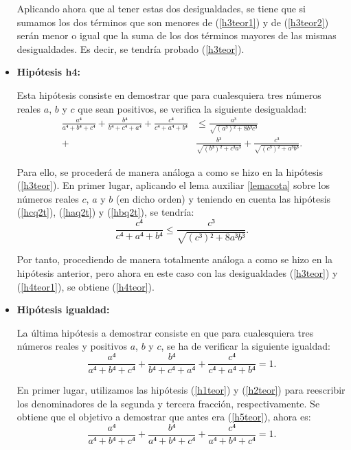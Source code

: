 \begin{demostracion}
\begin{itemize}
    Aplicando ahora que al tener estas dos desigualdades, se tiene que si
    sumamos los dos términos que son menores de (\ref{h3teor1}) y de
    (\ref{h3teor2}) serán menor o igual que la suma de los dos términos
    mayores de las mismas desigualdades. Es decir, se tendría probado
    (\ref{h3teor}).

  \item \textbf{Hipótesis h4:}

    Esta hipótesis consiste en demostrar que para cualesquiera tres números
    reales \(a\), \(b\) y \(c\) que sean positivos, se verifica la
    siguiente desigualdad:
    \begin{align*}\label{h4teor}\tag{h4}
      \frac{a⁴}{a⁴+b⁴+c⁴}+\frac{b⁴}{b⁴+c⁴+a⁴}+\frac{c⁴}{c⁴+a⁴+b⁴}&≤
      \frac{a³}{\sqrt{(a³)²+8b³c³}}\\+&\frac{b³}{\sqrt{(b³)²+c³a³}}+
      \frac{c³}{\sqrt{(c³)²+a³b³}}.
    \end{align*}

    Para ello, se procederá de manera análoga a como se hizo en la
    hipótesis (\ref{h3teor}). En primer lugar, aplicando el lema auxiliar
    \ref{lemacota} sobre los números reales \(c\), \(a\) y \(b\) (en dicho
    orden) y teniendo en cuenta las hipótesis (\ref{hcq2t}), (\ref{haq2t})
    y (\ref{hbq2t}), se tendría:
    \begin{equation}\label{h4teor1}
      \frac{c⁴}{c⁴+a⁴+b⁴}≤
      \frac{c³}{\sqrt{(c³)²+8a³b³}}.
    \end{equation}

    Por tanto, procediendo de manera totalmente análoga a como se hizo en
    la hipótesis anterior, pero ahora en este caso con las desigualdades
    (\ref{h3teor}) y (\ref{h4teor1}), se obtiene (\ref{h4teor}).

  \item \textbf{Hipótesis igualdad:}

    La última hipótesis a demostrar consiste en que para cualesquiera
    tres números reales y positivos \(a\), \(b\) y \(c\), se ha de
    verificar la siguiente igualdad:
    \begin{equation}\label{h5teor}\tag{igualdad}
      \frac{a⁴}{a⁴+b⁴+c⁴}+\frac{b⁴}{b⁴+c⁴+a⁴}+\frac{c⁴}{c⁴+a⁴+b⁴}=1.
    \end{equation}

    En primer lugar, utilizamos las hipótesis (\ref{h1teor}) y
    (\ref{h2teor}) para reescribir los denominadores de la segunda y
    tercera fracción, respectivamente. Se obtiene que el objetivo a
    demostrar que antes era (\ref{h5teor}), ahora es:
    \begin{equation}\label{h5teor1}
      \frac{a⁴}{a⁴+b⁴+c⁴}+\frac{b⁴}{a⁴+b⁴+c⁴}+\frac{c⁴}{a⁴+b⁴+c⁴}=1.
    \end{equation}


\end{itemize}
\end{demostracion}
